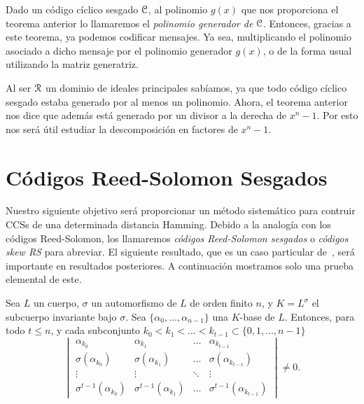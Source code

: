 Dado un código cíclico sesgado \(\mathcal{C}\), al polinomio \(g(x)\) que nos proporciona el teorema anterior lo llamaremos el \textit{polinomio generador de} \(\mathcal{C}\). Entonces, gracias a este teorema, ya podemos codificar mensajes. Ya sea, multiplicando el polinomio asociado a dicho mensaje por el polinomio generador \(g(x)\), o de la forma usual utilizando la matriz generatriz.

Al ser \(\mathcal{R}\) un dominio de ideales principales sabíamos, ya que todo código cíclico sesgado estaba generado por al menos un polinomio. Ahora, el teorema anterior nos dice que además está generado por un divisor a la derecha de \(x^{n} -1 \). Por esto nos será útil estudiar la descomposición en factores de \(x^{n} - 1\).
\section{Códigos Reed-Solomon Sesgados}%
\label{sec:códigos_reed_solomon_sesgados}

Nuestro siguiente objetivo será proporcionar un método sistemático para contruir CCSs de una determinada distancia Hamming. Debido a la analogía con los códigos Reed-Solomon, los llamaremos \textit{códigos Reed-Solomon sesgados} o \textit{códigos skew RS} para abreviar. El siguiente resultado, que es un caso particular de~\cite[Corolario 4.13]{lam_vandermonde_1988}, será importante en resultados posteriores. A continuación mostramos solo una prueba elemental de este.

\begin{lemma}
\label{lem:det_0}
    Sea \(L\) un cuerpo, \(\sigma\) un automorfismo de \(L\) de orden finito \(n\), y \(K = L^\sigma\) el subcuerpo invariante bajo \(\sigma\). Sea  \(\{\alpha_0, \dots, \alpha_{n-1}\}\) una \(K\)-base de \(L\). Entonces, para todo \(t \leq n\), y cada subconjunto \(k_0 < k_1 < \dots < k_{t-1} \subset \{0, 1, \dots, n-1\}\)
    \[
    \begin{vmatrix}
        \alpha_{k_0} & \alpha_{k_1} & \dots & \alpha_{k_{t -1}} \\
        \sigma(\alpha_{k_0}) & \sigma(\alpha_{k_1}) & \dots & \sigma(\alpha_{k_{t-1}}) \\
        \vdots & \vdots & \ddots & \vdots \\
        \sigma^{t-1}(\alpha_{k_0}) & \sigma^{t-1}(\alpha_{k_1}) & \dots & \sigma^{t-1}(\alpha_{k_{t-1}})
    \end{vmatrix}
    \neq 0
    .\]
\end{lemma}

